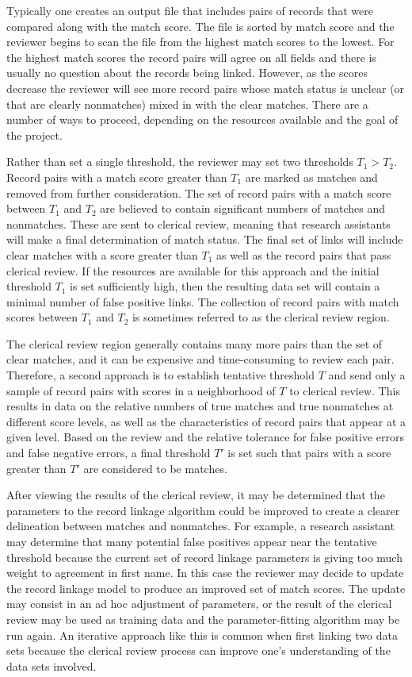 \documentclass[]{krantz}
\begin{document}
Typically one creates an output file that includes pairs of records that
were compared along with the match score. The file is sorted by match
score and the reviewer begins to scan the file from the highest match
scores to the lowest. For the highest match scores the record pairs will
agree on all fields and there is usually no question about the records
being linked. However, as the scores decrease the reviewer will see more
record pairs whose match status is unclear (or that are clearly
nonmatches) mixed in with the clear matches. There are a number of ways
to proceed, depending on the resources available and the goal of the
project.

Rather than set a single threshold, the reviewer may set two thresholds
\(T_1 > T_2\). Record pairs with a match score greater than \(T_1\) are
marked as matches and removed from further consideration. The set of
record pairs with a match score between \(T_1\) and \(T_2\) are believed
to contain significant numbers of matches and nonmatches. These are sent
to clerical review, meaning that research assistants will make a final
determination of match status. The final set of links will include clear
matches with a score greater than \(T_1\) as well as the record pairs
that pass clerical review. If the resources are available for this
approach and the initial threshold \(T_1\) is set sufficiently high,
then the resulting data set will contain a minimal number of false
positive links. The collection of record pairs with match scores between
\(T_1\) and \(T_2\) is sometimes referred to as the clerical review
region.

The clerical review region generally contains many more pairs than the
set of clear matches, and it can be expensive and time-consuming to
review each pair. Therefore, a second approach is to establish tentative
threshold \(T\) and send only a sample of record pairs with scores in a
neighborhood of \(T\) to clerical review. This results in data on the
relative numbers of true matches and true nonmatches at different score
levels, as well as the characteristics of record pairs that appear at a
given level. Based on the review and the relative tolerance for false
positive errors and false negative errors, a final threshold \(T'\) is
set such that pairs with a score greater than \(T'\) are considered to
be matches.

After viewing the results of the clerical review, it may be determined
that the parameters to the record linkage algorithm could be improved to
create a clearer delineation between matches and nonmatches. For
example, a research assistant may determine that many potential false
positives appear near the tentative threshold because the current set of
record linkage parameters is giving too much weight to agreement in
first name. In this case the reviewer may decide to update the record
linkage model to produce an improved set of match scores. The update may
consist in an ad hoc adjustment of parameters, or the result of the
clerical review may be used as training data and the parameter-fitting
algorithm may be run again. An iterative approach like this is common
when first linking two data sets because the clerical review process can
improve one's understanding of the data sets involved.
\end{document}
